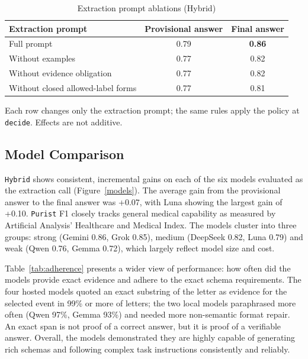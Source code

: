 \documentclass[conference]{IEEEtran}
\begin{document}
\begin{table}[!t]
\caption{Extraction prompt ablations (Hybrid)}
\label{tab:ablations}
\centering
\begin{tabularx}{\linewidth}{lCC}
\toprule
\textbf{Extraction prompt} &
\textbf{Provisional answer} &
\textbf{Final answer} \\
\midrule
Full prompt & 0.79 & \textbf{0.86} \\
\midrule
Without examples & 0.77 & 0.82  \\
Without evidence obligation & 0.77 & 0.82 \\
Without closed allowed-label forms & 0.77 & 0.81 \\
\midrule
\bottomrule
\end{tabularx}

\vspace*{2pt}
\begin{minipage}{\linewidth}
\raggedright\footnotesize
Each row changes only the extraction prompt; the same rules apply the policy at \texttt{decide}. Effects are not additive.\end{minipage}
\end{table}

\subsection{Model Comparison}
\label{sec:models}

\texttt{Hybrid} shows consistent, incremental gains on each 
of the six models evaluated as the extraction call 
(Figure~\ref{models}). The average gain from the provisional 
answer to the final answer was +0.07, with Luna showing the 
largest gain of +0.10. \texttt{Purist} F1 closely tracks 
general medical capability as measured by Artificial Analysis' 
Healthcare and Medical Index. The models cluster into three 
groups: strong (Gemini 0.86, Grok 0.85), medium (DeepSeek 
0.82, Luna 0.79) and weak (Qwen 0.76, Gemma 0.72), which 
largely reflect model size and cost.

Table~\ref{tab:adherence} presents a wider view of performance:
how often did the models provide exact evidence and adhere to
the exact schema requirements. The four hosted models quoted 
an exact substring of the letter as evidence for the selected event 
in 99\% or more of letters; the two local models paraphrased more 
often (Qwen 97\%, Gemma 93\%) and needed more non-semantic 
format repair. An exact span is not proof of a correct answer, but
it is proof of a verifiable answer. Overall, the models demonstrated
they are highly capable of generating rich schemas and following
complex task instructions consistently and reliably.
\end{document}

